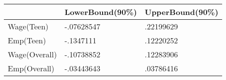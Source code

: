 \begin{table}[htbp]
\begin{tabular}{|l|l|l|}\hline  
 & LowerBound(90\%)  & UpperBound(90\%)  \\ \hline  
Wage(Teen) & -.07628547 & .22199629 \\ \hline 
Emp(Teen) & -.1347111 & .12220252 \\ \hline 
Wage(Overall) & -.10738852 & .12283906 \\ \hline 
Emp(Overall) & -.03443643 & .03786416 \\ \hline 
  \end{tabular}
\end{table}
